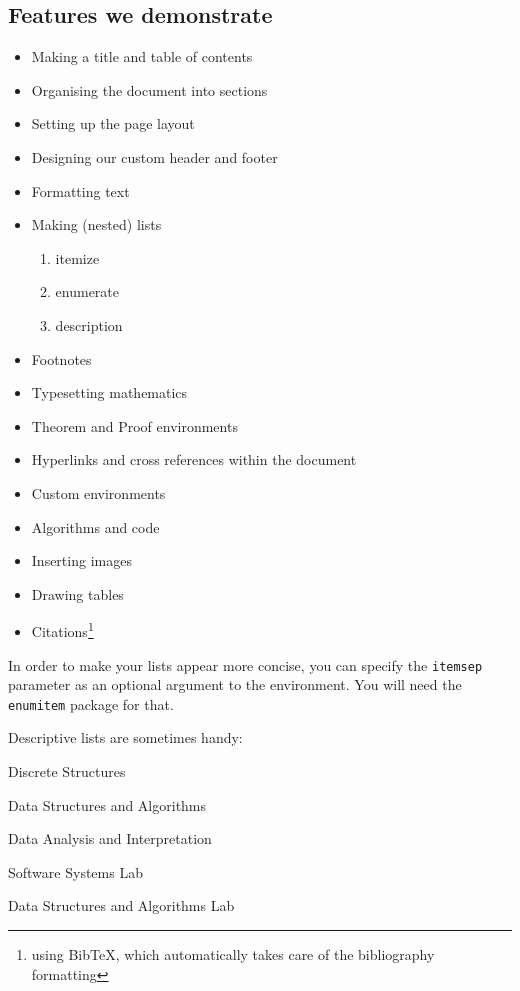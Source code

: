 \documentclass[a4paper]{article}
\begin{document}
\subsection*{Features we demonstrate}
\begin{itemize}
    \setlength\itemsep{0em}
    \item Making a title and table of contents
    \item Organising the document into sections
    \item Setting up the page layout
    \item Designing our custom header and footer
    \item Formatting text
    \item Making (nested) lists
          \begin{enumerate}
              \setlength\itemsep{0em}
              \item itemize
              \item enumerate
              \item description
          \end{enumerate}
    \item Footnotes
    \item Typesetting mathematics
    \item Theorem and Proof environments
    \item Hyperlinks and cross references within the document
    \item Custom environments
    \item Algorithms and code
    \item Inserting images
    \item Drawing tables
    \item Citations\footnote{using BibTeX, which automatically takes care of the bibliography formatting}
\end{itemize}
\noindent
In order to make your lists appear more concise, you can specify the \verb!itemsep! parameter as an optional argument to the environment. You will need the \verb!enumitem! package for that.\par\medskip
Descriptive lists are sometimes handy:
\begin{description}
    \setlength\itemsep{0em}
    \item[CS 207] Discrete Structures
    \item[CS 213] Data Structures and Algorithms
    \item[CS 215] Data Analysis and Interpretation
    \item[CS 251] Software Systems Lab
    \item[CS 293] Data Structures and Algorithms Lab
\end{description}
\end{document}
